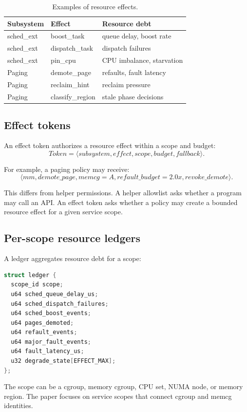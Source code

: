 \documentclass[letterpaper,twocolumn,10pt]{article}
\begin{document}
\begin{table}[t]
\centering
\caption{Examples of resource effects.}
\begin{tabular}{lll}
\toprule
Subsystem & Effect & Resource debt \\
\midrule
sched\_ext & boost\_task & queue delay, boost rate \\
sched\_ext & dispatch\_task & dispatch failures \\
sched\_ext & pin\_cpu & CPU imbalance, starvation \\
Paging & demote\_page & refaults, fault latency \\
Paging & reclaim\_hint & reclaim pressure \\
Paging & classify\_region & stale phase decisions \\
\bottomrule
\end{tabular}
\end{table}

\subsection{Effect tokens}

An effect token authorizes a resource effect within a scope and budget:
\[
Token = \langle subsystem, effect, scope, budget, fallback \rangle.
\]

For example, a paging policy may receive:
\[
\langle mm, demote\_page, memcg=A, refault\_budget=2.0x, revoke\_demote \rangle.
\]

This differs from helper permissions. A helper allowlist asks whether a program may call an API. An effect token asks whether a policy may create a bounded resource effect for a given service scope.

\subsection{Per-scope resource ledgers}

A ledger aggregates resource debt for a scope:

\begin{lstlisting}[language=C,basicstyle=\ttfamily\small]
struct ledger {
  scope_id scope;
  u64 sched_queue_delay_us;
  u64 sched_dispatch_failures;
  u64 sched_boost_events;
  u64 pages_demoted;
  u64 refault_events;
  u64 major_fault_events;
  u64 fault_latency_us;
  u32 degrade_state[EFFECT_MAX];
};
\end{lstlisting}

The scope can be a cgroup, memory cgroup, CPU set, NUMA node, or memory region. The paper focuses on service scopes that connect cgroup and memcg identities.
\end{document}
